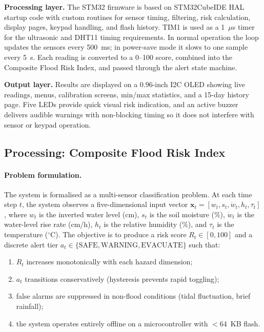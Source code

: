 \documentclass[5p,twocolumn]{elsarticle}
\begin{document}
\textbf{Processing layer.} The STM32 firmware is based on STM32CubeIDE HAL startup code with custom routines for sensor timing, filtering, risk calculation, display pages, keypad handling, and flash history. TIM1 is used as a 1~$\mu$s timer for the ultrasonic and DHT11 timing requirements. In normal operation the loop updates the sensors every 500~ms; in power-save mode it slows to one sample every 5~s. Each reading is converted to a 0--100 score, combined into the Composite Flood Risk Index, and passed through the alert state machine.

\textbf{Output layer.} Results are displayed on a 0.96-inch I2C OLED showing live readings, menus, calibration screens, min/max statistics, and a 15-day history page. Five LEDs provide quick visual risk indication, and an active buzzer delivers audible warnings with non-blocking timing so it does not interfere with sensor or keypad operation.

\subsection{Processing: Composite Flood Risk Index}

\paragraph{Problem formulation.} The system is formalised as a multi-sensor classification problem. At each time step $t$, the system observes a five-dimensional input vector $\mathbf{x}_t = [w_t, s_t, \dot{w}_t, h_t, \tau_t]$, where $w_t$ is the inverted water level (cm), $s_t$ is the soil moisture (\%), $\dot{w}_t$ is the water-level rise rate (cm/h), $h_t$ is the relative humidity (\%), and $\tau_t$ is the temperature ($^\circ$C). The objective is to produce a risk score $R_t \in [0, 100]$ and a discrete alert tier $a_t \in \{\text{SAFE}, \text{WARNING}, \text{EVACUATE}\}$ such that:

\begin{enumerate}[nosep]
  \item $R_t$ increases monotonically with each hazard dimension;
  \item $a_t$ transitions conservatively (hysteresis prevents rapid toggling);
  \item false alarms are suppressed in non-flood conditions (tidal fluctuation, brief rainfall);
  \item the system operates entirely offline on a microcontroller with $<$64~KB flash.
\end{enumerate}
\end{document}
